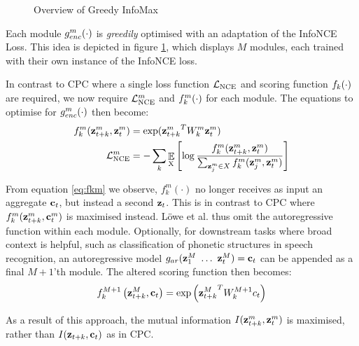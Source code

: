 \begin{figure}[h!t]
\begin{annotatedFigure}
		
		
		
		
		
	\end{annotatedFigure}
	\caption{Overview of Greedy InfoMax}
	\label{fig:gim-overview}
\end{figure}
	
		Each module $g_{enc}^m(\cdot)$ is \textit{greedily} optimised with an adaptation of the InfoNCE Loss. This idea is depicted in figure \ref{fig:gim-overview}, which displays $M$ modules, each trained with their own instance of the InfoNCE loss.
		
		In contrast to CPC where a single loss function $\mathcal{L}_{\text{NCE}}$ and scoring function $f_k(\cdot)$ are required, we now require $\mathcal{L}_{\text{NCE}}^m$ and $f_k^m(\cdot)$ for each module. The equations to optimise for $g_{enc}^m(\cdot)$ then become:
		\begin{align}
			f_k^m(\mathbf{z}_{t+k}^m,\mathbf{z}_t^m) &= \exp({\mathbf{z}_{t+k}^m}^TW_k^m\mathbf{z}_t^m) \label{eq:fkm} \\
			\mathcal{L}_{\text{NCE}}^m &= -\sum_{k} \mathop{\mathbb{E}}_{\substack{\textsubscript{X}}} \left[\log \frac{f_k^m(\mathbf{z}_{t+k}^m,\mathbf{z}_t^m) }{\sum_{\mathbf{z}_j^m \in X} f_k^m(\mathbf{z}_j^m, \mathbf{z}_t^m)} \right]	
		\end{align}
	
		From equation \ref{eq:fkm} we observe, $f_k^m( \cdot )$ no longer receives as input an aggregate $\mathbf{c}_t$, but instead a second $\mathbf{z}_t$. This is in contrast to CPC where $f_k^m(\mathbf{z}_{t+k}^m,\mathbf{c}_t^m)$ is maximised instead. Löwe et al. thus omit the autoregressive function within each module. Optionally, for downstream tasks where broad context is helpful, such as classification of phonetic structures in speech recognition, an autoregressive model $g_{ar}(\mathbf{z}_1^M ~ \dots ~ \mathbf{z}_t^M) = \mathbf{c}_t$ can be appended as a final $M+1$'th module. The altered scoring function then becomes:
		$$
		f_k^{M+1}\left(\mathbf{z}_{t+k}^M, \mathbf{c}_t \right)=\exp \left({\mathbf{z}_{t+k}^M}^T W_k^{M+1} c_t \right)
		$$

			As a result of this approach, the mutual information $I(\mathbf{z}_{t+k}^m,\mathbf{z}_t^m)$ is maximised, rather than $I(\mathbf{z}_{t+k}, \mathbf{c}_t)$ as in CPC. %
		
